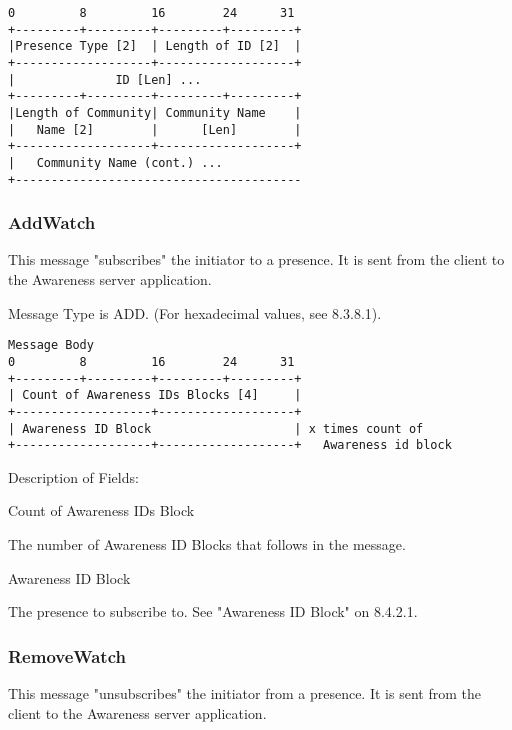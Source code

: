 \documentclass[titlepage,oneside]{book}
\begin{document}
\begin{verbatim}
0         8         16        24      31
+---------+---------+---------+---------+
|Presence Type [2]  | Length of ID [2]  |
+-------------------+-------------------+
|              ID [Len] ...
+---------+---------+---------+---------+
|Length of Community| Community Name    |
|   Name [2]        |      [Len]        |
+-------------------+-------------------+
|   Community Name (cont.) ...
+----------------------------------------
\end{verbatim}

\subsubsection{AddWatch}

\par{} This message "subscribes" the initiator to a presence. It is sent
from the client to the Awareness server application.

\par{} Message Type is ADD.
  (For hexadecimal values, see 8.3.8.1).

\begin{verbatim}
Message Body
0         8         16        24      31
+---------+---------+---------+---------+
| Count of Awareness IDs Blocks [4]     |
+-------------------+-------------------+
| Awareness ID Block                    | x times count of
+-------------------+-------------------+   Awareness id block
\end{verbatim}

\par{} Description of Fields:

\par{} Count of Awareness IDs Block

\subpar{}  The number of Awareness ID Blocks that follows in the message.

\par{} Awareness ID Block

\subpar{}  The presence to subscribe to. See "Awareness ID Block" on
8.4.2.1.

\subsubsection{RemoveWatch}

\par{} This message "unsubscribes" the initiator from a presence. It is sent 
from the client to the Awareness server application.
\end{document}

